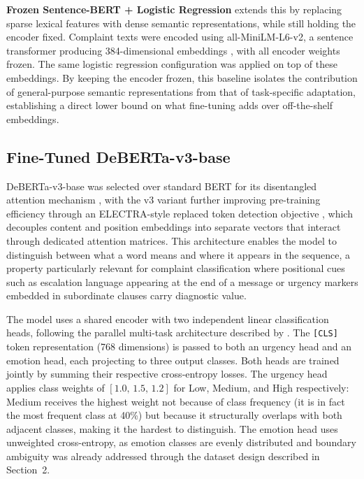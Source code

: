 \documentclass[11pt]{article}
\begin{document}
\textbf{Frozen Sentence-BERT + Logistic Regression} extends this by replacing sparse
lexical features with dense semantic representations, while still holding the encoder
fixed. Complaint texts were encoded using all-MiniLM-L6-v2, a sentence transformer
producing 384-dimensional embeddings \citep{reimers2019sbert}, with all encoder weights
frozen. The same logistic regression configuration was applied on top of these
embeddings. By keeping the encoder frozen, this baseline isolates the contribution of
general-purpose semantic representations from that of task-specific adaptation,
establishing a direct lower bound on what fine-tuning adds over off-the-shelf
embeddings.

\subsection{Fine-Tuned DeBERTa-v3-base}

DeBERTa-v3-base was selected over standard BERT for its disentangled attention
mechanism \citep{he2021deberta}, with the v3 variant further improving pre-training
efficiency through an ELECTRA-style replaced token detection objective
\citep{he2023debertav3}, which decouples content and position embeddings into separate
vectors that interact through dedicated attention matrices. This architecture enables
the model to distinguish between what a word means and where it appears in the
sequence, a property particularly relevant for complaint classification where positional
cues such as escalation language appearing at the end of a message or urgency markers
embedded in subordinate clauses carry diagnostic value.

The model uses a shared encoder with two independent linear classification heads,
following the parallel multi-task architecture described by \citet{chen2024multitask}.
The \texttt{[CLS]} token representation (768 dimensions) is passed to both an urgency
head and an emotion head, each projecting to three output classes. Both heads are
trained jointly by summing their respective cross-entropy losses. The urgency head
applies class weights of $[1.0,\,1.5,\,1.2]$ for Low, Medium, and High respectively:
Medium receives the highest weight not because of class frequency (it is in fact the
most frequent class at 40\%) but because it structurally overlaps with both adjacent
classes, making it the hardest to distinguish. The emotion head uses unweighted
cross-entropy, as emotion classes are evenly distributed and boundary ambiguity was
already addressed through the dataset design described in Section~2.
\end{document}
